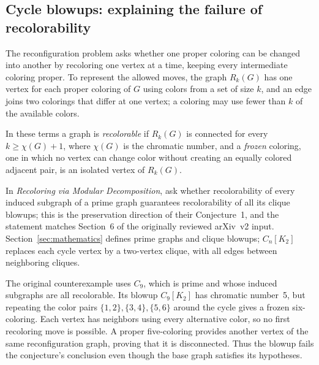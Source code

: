 \subsection{Cycle blowups: explaining the failure of recolorability}

The reconfiguration problem asks whether one proper coloring can be changed into another by recoloring one vertex at a time, keeping every intermediate coloring proper. To represent the allowed moves, the graph $R_k(G)$ has one vertex for each proper coloring of $G$ using colors from a set of size $k$, and an edge joins two colorings that differ at one vertex; a coloring may use fewer than $k$ of the available colors.

In these terms a graph is \emph{recolorable} if $R_k(G)$ is connected for every $k\ge\chi(G)+1$, where $\chi(G)$ is the chromatic number, and a \emph{frozen} coloring, one in which no vertex can change color without creating an equally colored adjacent pair, is an isolated vertex of $R_k(G)$.

In \emph{Recoloring via Modular Decomposition}, \citet{belavadi2026recoloring} ask whether recolorability of every induced subgraph of a prime graph guarantees recolorability of all its clique blowups; this is the preservation direction of their Conjecture~1, and the statement matches Section~6 of the originally reviewed arXiv~v2 input. Section~\ref{sec:mathematics} defines prime graphs and clique blowups; $C_n[K_2]$ replaces each cycle vertex by a two-vertex clique, with all edges between neighboring cliques.

The original counterexample uses $C_9$, which is prime and whose
induced subgraphs are all recolorable. Its blowup $C_9[K_2]$ has
chromatic number~5, but repeating the color pairs
$\{1,2\},\{3,4\},\{5,6\}$ around the cycle gives a frozen
six-coloring. Each vertex has neighbors using every alternative
color, so no first recoloring move is possible. A proper five-coloring
provides another vertex of the same reconfiguration graph, proving
that it is disconnected. Thus the blowup fails the conjecture's
conclusion even though the base graph satisfies its hypotheses.

